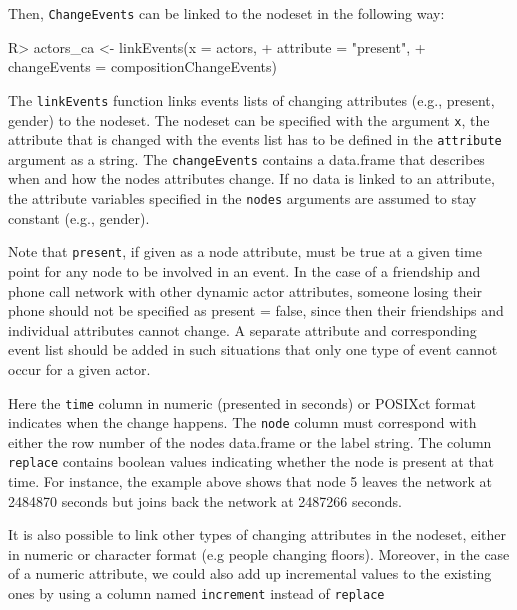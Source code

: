\documentclass[article]{jss}
\begin{document}
Then, \texttt{ChangeEvents} can be linked to the nodeset in the following way:  

%
\begin{Schunk}
\begin{Sinput}
R> actors_ca <- linkEvents(x = actors, 
+                      attribute = "present",
+                      changeEvents = compositionChangeEvents)
\end{Sinput}
\end{Schunk}
%

The \texttt{linkEvents} function links events lists of changing attributes (e.g., present, gender) to the nodeset. The nodeset can be specified with the argument \texttt{x}, the attribute that is changed with the events list has to be defined in the \texttt{attribute} argument as a string. The \texttt{changeEvents} contains a data.frame that describes when and how the nodes attributes change. If no data is linked to an attribute, the attribute variables specified in the \texttt{nodes} arguments are assumed to stay constant (e.g., gender). 

\begin{leftbar}
Note that \texttt{present}, if given as a node attribute, must be true at a given time point for any node to be involved in an event. In the case of a friendship and phone call network with other dynamic actor attributes, someone losing their phone should not be specified as present = false, since then their friendships and individual attributes cannot change. A separate attribute and corresponding event list should be added in such situations that only one type of event cannot occur for a given actor.  
\end{leftbar}

Here the \texttt{time} column in numeric (presented in seconds) or POSIXct format indicates when the change happens. The \texttt{node} column must correspond with either the row number of the nodes data.frame or the label string. The column \texttt{replace} contains boolean values indicating whether the node is present at that time. For instance, the example above shows that node 5 leaves the network at 2484870 seconds but joins back the network at 2487266 seconds. 

It is also possible to link other types of changing attributes in the nodeset, either in numeric or character format (e.g people changing floors). Moreover, in the case of a numeric attribute, we could also add up incremental values to the existing ones by using a column named \texttt{increment} instead of \texttt{replace}
\end{document}
